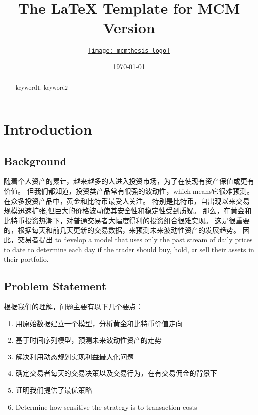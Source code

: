 \documentclass{mcmthesis}
\title{The \LaTeX{} Template for MCM Version \MCMversion}
\author{\small \href{https://www.latexstudio.net/}
  {\texttt{[image: mcmthesis-logo]}}}
\date{\today}
\begin{document}
\begin{abstract}


\begin{keywords}
keyword1; keyword2


\end{keywords}
\end{abstract}
\maketitle

\newpage
\thispagestyle{empty}
\tableofcontents
\newpage


\section{Introduction}
\subsection{Background}
随着个人资产的累计，越来越多的人进入投资市场，为了在使现有资产保值或更有价值。
但我们都知道，投资类产品常有很强的波动性，which means它很难预测。
在众多投资产品中，黄金和比特币最受人关注。
特别是比特币，自出现以来交易规模迅速扩张,但巨大的价格波动使其安全性和稳定性受到质疑。
那么，在黄金和比特币投资热潮下，对普通交易者大幅度得利的投资组合很难实现。
这是很重要的，根据每天和前几天更新的交易数据，来预测未来波动性资产的发展趋势。
因此，交易者提出 to develop a model that uses only the past stream of daily prices 
to date to determine each day if the trader should buy, hold, or sell their assets in their portfolio.


\subsection{Problem Statement}
根据我们的理解，问题主要有以下几个要点：
\begin{enumerate}    %
  \item 用原始数据建立一个模型，分析黄金和比特币价值走向
  \item 基于时间序列模型，预测未来波动性资产的走势
  \item 解决利用动态规划实现利益最大化问题
  \item 确定交易者每天的交易决策以及交易行为，在有交易佣金的背景下
  \item 证明我们提供了最优策略
  \item Determine how sensitive the strategy is to transaction costs
\end{enumerate}
\end{document}
